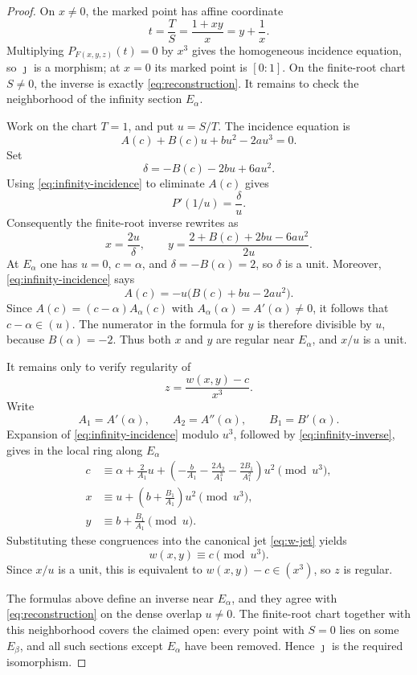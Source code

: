 \begin{proof}
On \(x\ne0\), the marked point has affine coordinate
\[
t=\frac{T}{S}=\frac{1+xy}{x}=y+\frac1x.
\]
Multiplying \(P_{F(x,y,z)}(t)=0\) by \(x^3\) gives the homogeneous incidence
equation, so \(\jmath\) is a morphism; at \(x=0\) its marked point is
\([0:1]\).  On the finite-root chart \(S\ne0\), the inverse is exactly
\eqref{eq:reconstruction}.  It remains to check the neighborhood of the
infinity section \(E_\alpha\).

Work on the chart \(T=1\), and put \(u=S/T\).  The incidence equation is
\begin{equation}
\label{eq:infinity-incidence}
A(c)+B(c)u+bu^2-2au^3=0.
\end{equation}
Set
\[
\delta=-B(c)-2bu+6au^2.
\]
Using \eqref{eq:infinity-incidence} to eliminate \(A(c)\) gives
\[
P'(1/u)=\frac{\delta}{u}.
\]
Consequently the finite-root inverse rewrites as
\begin{equation}
\label{eq:infinity-inverse}
x=\frac{2u}{\delta},\qquad
y=\frac{2+B(c)+2bu-6au^2}{2u}.
\end{equation}
At \(E_\alpha\) one has \(u=0\), \(c=\alpha\), and
\(\delta=-B(\alpha)=2\), so \(\delta\) is a unit.  Moreover,
\eqref{eq:infinity-incidence} says
\[
A(c)=-u\bigl(B(c)+bu-2au^2\bigr).
\]
Since \(A(c)=(c-\alpha)A_\alpha(c)\) with
\(A_\alpha(\alpha)=A'(\alpha)\ne0\), it follows that
\(c-\alpha\in(u)\).  The numerator in the formula for \(y\) is therefore
divisible by \(u\), because \(B(\alpha)=-2\).  Thus both \(x\) and \(y\)
are regular near \(E_\alpha\), and \(x/u\) is a unit.

It remains only to verify regularity of
\[
z=\frac{w(x,y)-c}{x^3}.
\]
Write
\[
A_1=A'(\alpha),\qquad A_2=A''(\alpha),\qquad B_1=B'(\alpha).
\]
Expansion of \eqref{eq:infinity-incidence} modulo \(u^3\), followed by
\eqref{eq:infinity-inverse}, gives in the local ring along \(E_\alpha\)
\begin{align*}
c&\equiv \alpha+\frac{2}{A_1}u+
\left(-\frac b{A_1}-\frac{2A_2}{A_1^3}
-\frac{2B_1}{A_1^2}\right)u^2\pmod{u^3},\\
x&\equiv u+\left(b+\frac{B_1}{A_1}\right)u^2\pmod{u^3},\\
y&\equiv b+\frac{B_1}{A_1}\pmod u.
\end{align*}
Substituting these congruences into the canonical jet
\eqref{eq:w-jet} yields
\[
w(x,y)\equiv c\pmod{u^3}.
\]
Since \(x/u\) is a unit, this is equivalent to
\(w(x,y)-c\in(x^3)\), so \(z\) is regular.

The formulas above define an inverse near \(E_\alpha\), and they agree with
\eqref{eq:reconstruction} on the dense overlap \(u\ne0\).  The finite-root
chart together with this neighborhood covers the claimed open: every point
with \(S=0\) lies on some \(E_\beta\), and all such sections except
\(E_\alpha\) have been removed.  Hence \(\jmath\) is the required
isomorphism.
\end{proof}

